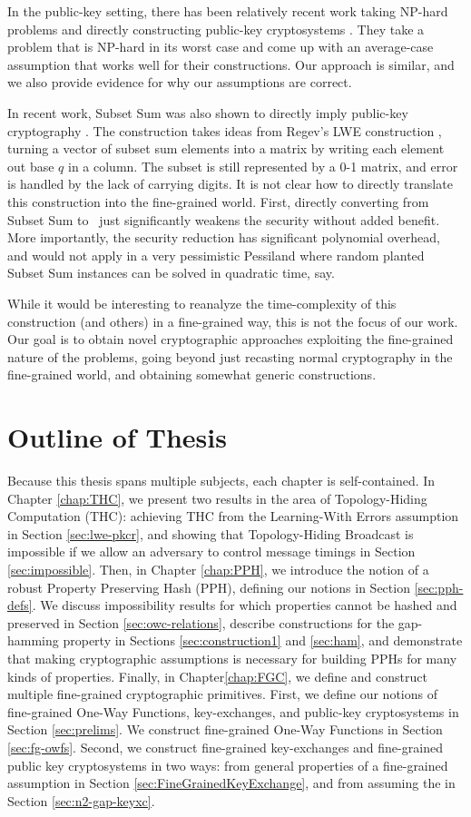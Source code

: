 In the public-key setting, there has been relatively recent work taking NP-hard problems and directly constructing public-key cryptosystems \cite{ABW10}. They take a problem that is NP-hard in its worst case and come up with an average-case assumption that works well for their constructions. Our approach is similar, and we also provide evidence for why our assumptions are correct.

In recent work, Subset Sum was also shown to directly imply public-key cryptography \cite{LPS10}. The construction takes ideas from Regev's LWE construction \cite{Regev05}, turning a vector of subset sum elements into a matrix by writing each element out base $q$ in a column. The subset is still represented by a 0-1 matrix, and error is handled by the lack of carrying digits. It is not clear how to directly translate this construction into the fine-grained world. First, directly converting from Subset Sum to \kSum~just significantly weakens the security without added benefit. More importantly, the security reduction has significant polynomial overhead, and would not apply in a very pessimistic Pessiland where random planted Subset Sum instances can be solved in quadratic time, say.

While it would be interesting to reanalyze the time-complexity of this construction (and others) in a fine-grained way, this is not the focus of our work. Our goal is to obtain novel cryptographic approaches exploiting the fine-grained nature of the problems, going beyond just recasting normal cryptography in the fine-grained world, and obtaining somewhat generic constructions.


\section{Outline of Thesis}
Because this thesis spans multiple subjects, each chapter is self-contained. In Chapter \ref{chap:THC}, we present two results in the area of Topology-Hiding Computation (THC): achieving THC from the Learning-With Errors assumption in Section \ref{sec:lwe-pkcr}, and showing that Topology-Hiding Broadcast is impossible if we allow an adversary to control message timings in Section \ref{sec:impossible}.
Then, in Chapter \ref{chap:PPH}, we introduce the notion of a robust Property Preserving Hash (PPH), defining our notions in Section \ref{sec:pph-defs}. We discuss impossibility results for which properties cannot be hashed and preserved in Section \ref{sec:owc-relations}, describe constructions for the gap-hamming property in Sections \ref{sec:construction1} and \ref{sec:ham}, and demonstrate that making cryptographic assumptions is necessary for building PPHs for many kinds of properties.
Finally, in Chapter\ref{chap:FGC}, we define and construct multiple fine-grained cryptographic primitives. First, we define our notions of fine-grained One-Way Functions, key-exchanges, and public-key cryptosystems in Section \ref{sec:prelims}. We construct fine-grained One-Way Functions in Section \ref{sec:fg-owfs}. Second, we construct fine-grained key-exchanges and fine-grained public key cryptosystems in two ways: from general properties of a fine-grained assumption in Section \ref{sec:FineGrainedKeyExchange}, and from assuming the \strongzkc in Section \ref{sec:n2-gap-keyxc}.